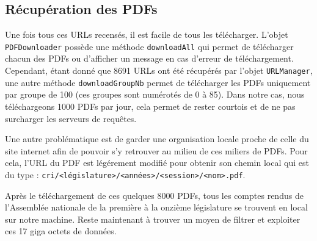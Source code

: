 \subsection{Récupération des PDFs}

Une fois tous ces URLs recensés, il est facile de tous les télécharger. L'objet \verb|PDFDownloader| possède une méthode \verb|downloadAll| qui permet de télécharger chacun des PDFs ou d'afficher un message en cas d'erreur de téléchargement. Cependant, étant donné que 8691 URLs ont été récupérés par l'objet \verb|URLManager|, une autre méthode \verb|downloadGroupNb| permet de télécharger les PDFs uniquement par groupe de 100 (ces groupes sont numérotés de 0 à 85). Dans notre cas, nous téléchargeons 1000 PDFs par jour, cela permet de rester courtois et de ne pas surcharger les serveurs de requêtes.

Une autre problématique est de garder une organisation locale proche de celle du site internet afin de pouvoir s'y retrouver au milieu de ces miliers de PDFs. Pour cela, l'URL du PDF est légérement modifié pour obtenir son chemin local qui est du type : \verb|cri/<législature>/<années>/<session>/<nom>.pdf|.

Après le téléchargement de ces quelques 8000 PDFs, tous les comptes rendus de l'Assemblée nationale de la première à la onzième législature se trouvent en local sur notre machine. Reste maintenant à trouver un moyen de filtrer et exploiter ces 17 giga octets de données.
